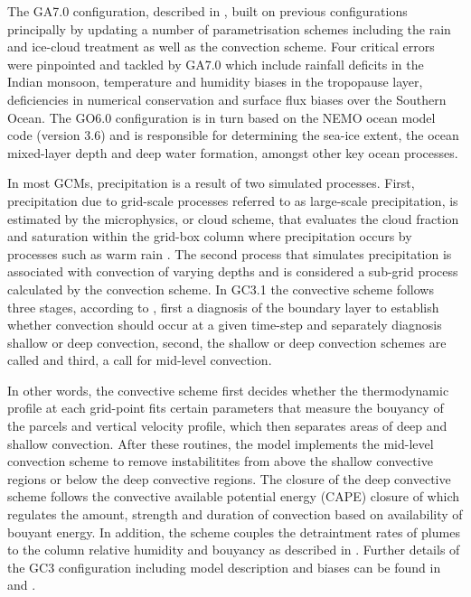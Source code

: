 The GA7.0 configuration, described in \cite{walters2019}, built on previous configurations principally by updating a number of parametrisation schemes including the rain and ice-cloud treatment as well as the convection scheme. Four critical errors were pinpointed and tackled by GA7.0 which include rainfall deficits in the Indian monsoon, temperature and humidity biases in the tropopause layer, deficiencies in numerical conservation and surface flux biases over the Southern Ocean. The GO6.0 configuration \citep{storkey2018} is in turn based on the NEMO ocean model code (version 3.6) and is responsible for determining the sea-ice extent, the ocean mixed-layer depth and deep water formation, amongst other key ocean processes.


In most GCMs, precipitation is a result of two simulated processes. First, precipitation due to grid-scale processes referred to as large-scale precipitation, is estimated by the microphysics, or cloud scheme, that evaluates the cloud fraction and saturation within the grid-box column where precipitation occurs by processes such as warm rain \citep{walters2019}. 
The second process that simulates precipitation is associated with convection of varying depths and is considered a sub-grid process calculated by the convection scheme. In GC3.1 the convective scheme follows three stages, according to \cite{walters2019}, first a diagnosis of the boundary layer to establish whether convection should occur at a given time-step and separately diagnosis shallow or deep convection, second, the shallow or deep convection schemes are called and third, a call for mid-level convection. 


In other words, the convective scheme first decides whether the thermodynamic profile at each grid-point fits certain parameters that measure the bouyancy of the parcels and vertical velocity profile, which then separates areas of deep and shallow convection. After these routines, the model implements the mid-level convection scheme to remove instabilitites from above the shallow convective regions or below the deep convective regions. 
The closure of the deep convective scheme follows the convective available potential energy (CAPE) closure of \cite{fritsch} which regulates the amount, strength and duration of convection based on availability of bouyant energy. In addition, the scheme couples the detraintment rates of plumes to the column relative humidity and bouyancy as described in \cite{derbyshire2011}.
Further details of the GC3 configuration including model description and biases can be found in \cite{williams2018} and \cite{kuhlbrodt2018}.


